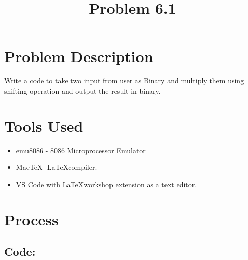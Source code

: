 \clearpage
\title{Problem 6.1}
\author{}
\date{}
\maketitle

\section*{Problem Description}
Write a code to take two input from user as Binary and multiply them using shifting operation and output the result in binary.

\section*{Tools Used}
\begin{itemize}
    \item emu8086 - 8086 Microprocessor Emulator
    \item MacTeX -\LaTeX  compiler.
    \item VS Code with \LaTeX workshop extension as a text editor.
\end{itemize}

\section*{Process}
\subsection*{Code:}


